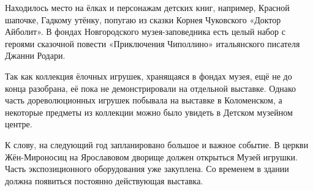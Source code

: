 Находилось место на ёлках и персонажам детских книг, например, Красной шапочке,
Гадкому утёнку, попугаю из сказки Корнея Чуковского «Доктор Айболит». В фондах
Новгородского музея-заповедника есть целый набор с героями сказочной повести
«Приключения Чиполлино» итальянского писателя Джанни Родари. 


Так как коллекция ёлочных игрушек, хранящаяся в фондах музея, ещё не до конца
разобрана, её пока не демонстрировали на отдельной выставке. Однако часть
дореволюционных игрушек побывала на выставке в Коломенском, а некоторые
предметы из коллекции можно было увидеть в Детском музейном центре. 

К слову, на следующий год запланировано большое и важное событие. В церкви
Жён-Мироносиц на Ярославовом дворище должен открыться Музей игрушки. Часть
экспозиционного оборудования уже закуплена. Со временем в здании должна
появиться постоянно действующая выставка. 

